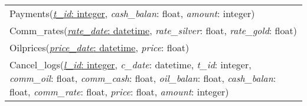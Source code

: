 \documentclass[12pt,a4paper]{report}
\begin{document}
\begin{mypara}
\begin{center}
\begin{tabular}{R{\textwidth}}
      Payments(\underline{\textit{t\_id}: integer}, \textit{cash\_balan}: float, \textit{amount}: integer)\\
      Comm\_rates(\underline{\textit{rate\_date}: datetime}, \textit{rate\_silver}: float, \textit{rate\_gold}: float)\\
      Oilprices(\underline{\textit{price\_date}: datetime}, \textit{price}: float)\\
      Cancel\_logs(\underline{\textit{l\_id}: integer}, \textit{c\_date}: datetime, \textit{t\_id}: integer, \textit{comm\_oil}: float, \textit{comm\_cash}: float, \textit{oil\_balan}: float, \textit{cash\_balan}: float, \textit{comm\_rate}: float, \textit{price}: float, \textit{amount}: integer)
    \end{tabular}
  \end{center}
  \par
\end{mypara}
\end{document}
